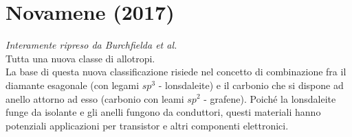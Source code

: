 \documentclass[a4paper,titlepage]{book}
\begin{document}
\chapter{Novamene (2017)}
\textit{Interamente ripreso da Burchfielda et al.\cite{NOVA}}\\

Tutta una nuova classe di allotropi.\\

La base di questa nuova classificazione risiede nel concetto di combinazione fra il diamante esagonale (con legami $sp^3$ - lonsdaleite) e il carbonio che si dispone ad anello attorno ad esso (carbonio con leami $sp^2$ - grafene). Poiché la lonsdaleite funge da isolante e gli anelli fungono da conduttori, questi materiali hanno potenziali applicazioni per transistor e altri componenti elettronici.
\end{document}
